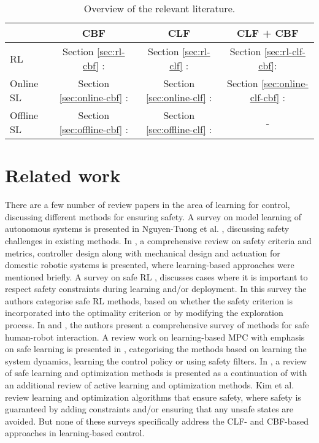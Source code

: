 \documentclass[3p,times,procedia]{elsarticle}
\begin{document}
\begin{table}[ht]\label{table:refs}
\centering
\caption{Overview of the relevant literature.}
\begin{tabular}[t]{lccc}
\hline
& CBF & CLF & CLF + CBF\\
\hline
RL & Section \ref{sec:rl-cbf} : \cite{Cheng2019, Marvi2020}  & Section \ref{sec:rl-clf} : \cite{Chow2019, Chow2018, Perkins2003, Berkenkamp2017} & Section \ref{sec:rl-clf-cbf}: \cite{Choi2020}\\
Online SL & Section \ref{sec:online-cbf} : \cite{ Khojasteh2019, Wang2017, Taylor2019a}  & Section \ref{sec:online-clf} : \cite{Castaneda2020, Mittal2020, Umlauft2017, Zhai2019, Berkenkamp2016} & Section \ref{sec:online-clf-cbf} : \cite{Jin2020, Dhiman2020}\\
Offline SL &  Section \ref{sec:offline-cbf} : \cite{Srinivasan2020, Zhao2020, Jagtap2020, Saveriano2019, Robey2020} & Section \ref{sec:offline-clf} : \cite{Taylor2019}   & -  \\
\hline
\end{tabular}

\end{table}%

\section{Related work}\label{sec:related_work}
There are a few number of review papers in the area of learning for control, discussing different methods for ensuring safety. A survey on model learning of autonomous systems is presented in Nguyen-Tuong et al. \cite{Nguyen-tuong2011}, discussing safety challenges in existing methods. In \cite{Tadele2014}, a comprehensive review on safety criteria and metrics, controller design along with mechanical design and actuation for domestic robotic systems is presented, where learning-based approaches were mentioned briefly. A survey on safe RL \cite{Garcia2015}, discusses cases where it is important to respect safety constraints during learning and/or deployment. In this survey the authors categorise safe RL methods, based on whether the safety criterion is incorporated into the optimality criterion or by modifying the exploration process. In \cite{Lasota2017} and \cite{Zacharaki2020}, the authors present a comprehensive survey of methods for safe human-robot interaction. A review work on learning-based MPC with emphasis on safe learning is presented in \cite{Hewing2020}, categorising the methods based on learning the system dynamics, learning the control policy or using safety filters. In \cite{Kim2021}, a review of safe learning and optimization methods is presented as a continuation of \cite{Garcia2015} with an additional review of active learning and optimization methods. Kim et al. \cite{Kim2021} review learning and optimization algorithms that ensure safety, where safety is guaranteed by adding constraints and/or ensuring that any unsafe states are avoided. But none of these surveys specifically address the CLF- and CBF-based approaches in learning-based control. 
\end{document}
